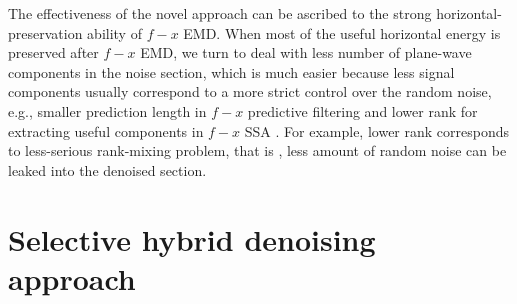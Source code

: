 The effectiveness of the novel approach can be ascribed to the strong horizontal-preservation ability of $f-x$ EMD. When most of the useful horizontal energy is preserved after $f-x$ EMD, we turn to deal with less number of plane-wave components in the noise section, which is much easier because less signal components usually correspond to a more strict control over the random noise, e.g., smaller prediction length in $f-x$ predictive filtering \cite[]{canales} and lower rank for extracting useful components in $f-x$ SSA \cite[]{mssa}. For example, lower rank corresponds to less-serious rank-mixing problem, that is , less amount of random noise can be leaked into the denoised section.


\section{Selective hybrid denoising approach}


